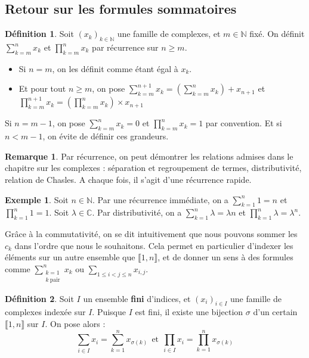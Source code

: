 \documentclass[french]{book}
\newcommand{\N}{\mathbb{N}}
\newcommand{\C}{\mathbb{C}}
\theoremstyle{plain}
\theoremstyle{definition}
\newtheorem{dfn}{Définition}[chapter]
\newtheorem{exa}{Exemple}[chapter]
\newtheorem{rmq}{Remarque}[chapter]
\theoremstyle{remark}
\begin{document}
\subsection{Retour sur les formules sommatoires}
\begin{dfn}
	Soit $(x_k)_{k\in\N}$ une famille de complexes, et $m\in\N$ fixé. On définit $\displaystyle \sum_{k=m}^{n}x_k$ et $\displaystyle \prod_{k=m}^{n}x_k$ par récurrence sur $n\geqslant m$.
	\begin{itemize}
		\item Si $n=m$, on les définit comme étant égal à $x_k$. 
		\item Et pour tout $n\geqslant m$, on pose $\displaystyle \sum_{k=m}^{n+1}x_k=\left(\sum_{k=m}^{n}x_k\right)+x_{n+1}$ et $\displaystyle \prod_{k=m}^{n+1}x_k=\left(\prod_{k=m}^{n}x_k\right)\times x_{n+1}$
	\end{itemize}
	Si $n=m-1$, on pose $\displaystyle \sum_{k=m}^{n}x_k=0$ et $\displaystyle \prod_{k=m}^{n}x_k=1$ par convention. Et si $n<m-1$, on évite de définir ces grandeurs.
\end{dfn}
\begin{rmq}
	Par récurrence, on peut démontrer les relations admises dans le chapitre sur les complexes : séparation et regroupement de termes, distributivité, relation de Chasles. A chaque fois, il s'agit d'une récurrence rapide.
\end{rmq}
\begin{exa}
	Soit $n\in\N$. Par une récurrence immédiate, on a $\displaystyle \sum_{k=1}^{n}1=n$ et $\displaystyle \prod_{k=1}^{n}1=1$. Soit $\lambda\in\C$. Par distributivité, on a $\displaystyle \sum_{k=1}^{n}\lambda=\lambda n$ et $\displaystyle \prod_{k=1}^{n}\lambda=\lambda^n$.
\end{exa}
Grâce à la commutativité, on se dit intuitivement que nous pouvons sommer les $c_k$ dans l'ordre que nous le souhaitons. Cela permet en particulier d'indexer les éléments sur un autre ensemble que $\llbracket1,n\rrbracket$, et de donner un sens à des formules comme $\displaystyle \sum_{\substack{k=1 \\ k \ \text{pair}}}^{n}x_k$ ou $\displaystyle \sum_{1\leqslant i<j\leqslant n}x_{i,j}$.
\begin{dfn}
	Soit $I$ un ensemble \textbf{fini} d'indices, et $(x_i)_{i\in I}$ une famille de complexes indexée sur $I$. Puisque $I$ est fini, il existe une bijection $\sigma$ d'un certain $\llbracket1,n\rrbracket$ sur $I$. On pose alors : $$\sum_{i\in I}x_i=\sum_{k=1}^{n}x_{\sigma(k)} \ \ \text{et} \ \ \prod_{i\in I}x_i=\prod_{k=1}^{n}x_{\sigma(k)}$$
\end{dfn}
\end{document}
